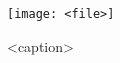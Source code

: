 \begin{figure}[h]
  \centering
  \texttt{[image: <file>]}
  \caption{<caption>}
  \label{fig:<label>}
\end{figure}
